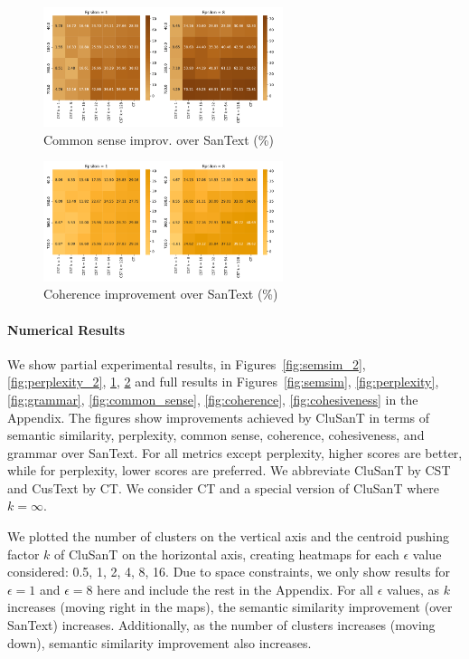 \documentclass[11pt]{article}
\newcommand{\clusant}{CluSanT\xspace}
\begin{document}
\begin{figure}[ht]
    \centering
    \includegraphics[width=7cm]{latex/fig/heatmap_common_sense_2.pdf}
    \caption{Common sense improv. over SanText (\%)}
    \label{fig:common_sense_2}
\end{figure}


\begin{figure}
    \centering
    \includegraphics[width=7cm]{latex/fig/heatmap_coherence_2.pdf}
    \caption{Coherence improvement over SanText (\%)}
    \label{fig:coherence_2}
\end{figure}










\paragraph{Numerical Results}
We show partial experimental results, in Figures~\ref{fig:semsim_2}, \ref{fig:perplexity_2}, \ref{fig:common_sense_2}, \ref{fig:coherence_2} 
and full results in Figures~\ref{fig:semsim}, \ref{fig:perplexity}, \ref{fig:grammar}, \ref{fig:common_sense}, \ref{fig:coherence}, \ref{fig:cohesiveness} in the Appendix. 
The figures show improvements achieved by \clusant in terms of semantic similarity, perplexity, common sense, coherence, cohesiveness, and grammar over SanText. 
For all metrics except perplexity, higher scores are better, while for perplexity, lower scores are preferred.
We abbreviate \clusant by CST and CusText by CT. We consider CT and a special version of \clusant where $k=\infty$.

We plotted the number of clusters on the vertical axis and the centroid pushing factor $k$ of \clusant on the horizontal axis, creating heatmaps for each $\epsilon$ value considered: 0.5, 1, 2, 4, 8, 16. Due to space constraints, we only show results for $\epsilon=1$ and $\epsilon=8$ here and include the rest in the Appendix. For all $\epsilon$ values, as $k$ increases (moving right in the maps), the semantic similarity improvement (over SanText) increases. Additionally, as the number of clusters increases (moving down), semantic similarity improvement also increases.
\end{document}
